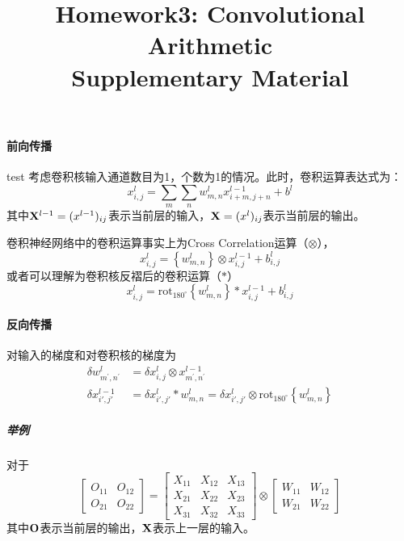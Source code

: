 \documentclass[12pt]{article}
\title{\textbf{ Homework3: Convolutional Arithmetic \\ Supplementary Material  }}
\author{}
\date{}
\begin{document}
\maketitle

\paragraph{前向传播} test
考虑卷积核输入通道数目为1，个数为1的情况。此时，卷积运算表达式为：
$$x_{i,j}^l = \sum_{m}\sum_{n} w_{m,n}^l x_{i + m,j + n}^{l-1} + b^l$$
其中$\mathbf{X}^{l-1} = (x^{l-1})_{ij}$表示当前层的输入，$\mathbf{X} = (x^l)_{ij}$表示当前层的输出。

卷积神经网络中的卷积运算事实上为Cross Correlation运算（$\otimes$），
$$x_{i,j}^l = \left\{ w_{m,n}^l \right\} \otimes x_{i,j}^{l-1} + b_{i,j}^l $$
或者可以理解为卷积核反褶后的卷积运算（$*$）
$$x_{i,j}^l = \text{rot}_{180^\circ} \left\{ w_{m,n}^l \right\} \ast x_{i,j}^{l-1} + b_{i,j}^l $$

\paragraph{反向传播}

对输入的梯度和对卷积核的梯度为
\begin{align}
	\delta  w_{m^{\prime},n^{\prime}}^l & = \delta x^{l}_{i,j} \otimes x_{m^{\prime},n^{\prime}}^{l-1}                                                                  \\
	\delta x_{i',j'}^{l-1}              & =  \delta x^{l}_{i',j'} \ast   w_{m,n}^{l} = \delta x^{l}_{i',j'} \otimes \text{rot}_{180^\circ} \left\{ w_{m,n}^{l} \right\}
\end{align}

\subparagraph{举例}
对于
\begin{equation}
	\begin{bmatrix}
		O_{11} & O_{12} \\
		O_{21} & O_{22}
	\end{bmatrix} =
	\begin{bmatrix}
		X_{11} & X_{12} & X_{13} \\
		X_{21} & X_{22} & X_{23} \\
		X_{31} & X_{32} & X_{33}
	\end{bmatrix}
	\otimes
	\begin{bmatrix}
		W_{11} & W_{12} \\
		W_{21} & W_{22}
	\end{bmatrix}
\end{equation}
其中$\mathbf{O}$表示当前层的输出，$\mathbf{X}$表示上一层的输入。
\end{document}
